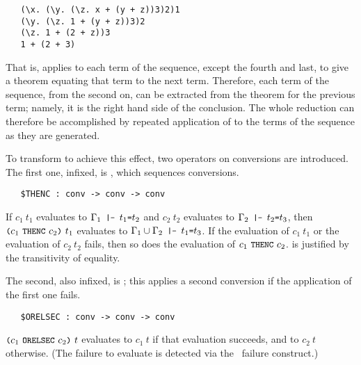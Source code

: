 \begin{hol}\begin{verbatim}
   (\x. (\y. (\z. x + (y + z))3)2)1 
   (\y. (\z. 1 + (y + z))3)2
   (\z. 1 + (2 + z))3
   1 + (2 + 3) 
\end{verbatim}\end{hol}

\noindent That is,  applies to each term of the sequence,
except the fourth and last, to give a theorem equating that term to the next
term. Therefore, each term of the sequence, from the second on, can be
extracted from the theorem for the previous term; namely, it is the right hand
side of the conclusion.  The whole reduction can therefore be accomplished by
repeated application of  to the terms of the sequence as they
are generated. 

To transform  to achieve this effect, two operators on
conversions are introduced.  The first one,
infixed, is , which sequences conversions.

\begin{boxed}
\begin{verbatim}
   $THENC : conv -> conv -> conv
\end{verbatim}\end{boxed}

\noindent If $c_1\ t_1$ evaluates to $\Gamma_1\ml{ |- }t_1\ml{=}t_2$ and
$c_2\ t_2$ evaluates to $\Gamma_2\ml{ |- }t_2\ml{=}t_3$, then
$\ml{(}c_1\ \ml{THENC}\ c_2\ml{)}\ t_1$ evaluates to
$\Gamma_1\cup \Gamma_2\ml{\ |-\ }t_1\ml{=}t_3$. If the
evaluation of $c_1\ t_1$ or the evaluation of $c_2\ t_2$ fails,
then so does the evaluation of $c_1\ \ml{THENC}\ c_2$.  is
justified by the transitivity of equality.

The second, also infixed, is ; this applies a second conversion if
the application of the first one fails.

\begin{boxed}
\begin{verbatim}
   $ORELSEC : conv -> conv -> conv
\end{verbatim}\end{boxed}

\noindent $\ml{(}c_1\ \ml{ORELSEC}\ c_2\ml{)}\ t$ evaluates to $c_1\ t$  
if that evaluation succeeds, and to
$c_2\ t$ otherwise. (The failure to evaluate is detected via
the \ML\ failure construct.)

